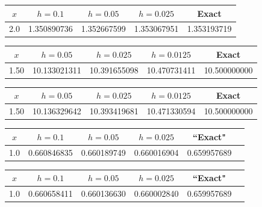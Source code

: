 \bigskip

{\small
\begin{tabular}{|c|r|r|r|r|}\hline
\multicolumn{1}{|c|}{$x$}&
\multicolumn{1}{|c|}{$h=0.1$}&
\multicolumn{1}{|c|}{$h=0.05$}&
\multicolumn{1}{|c|}{$h=0.025$}&
\multicolumn{1}{|c|}{Exact}\\ \hline
2.0 & 1.350890736 & 1.352667599 & 1.353067951 & 1.353193719\\
\hline
\end{tabular}}

\bigskip

{\small
\begin{tabular}{|c|r|r|r|r|}\hline
\multicolumn{1}{|c|}{$x$}&
\multicolumn{1}{|c|}{$h=0.05$}&
\multicolumn{1}{|c|}{$h=0.025$}&
\multicolumn{1}{|c|}{$h=0.0125$}&
\multicolumn{1}{|c|}{Exact}\\ \hline
1.50 & 10.133021311 & 10.391655098 & 10.470731411 & 10.500000000 \\
\hline
\end{tabular}}

\bigskip

{\small
\begin{tabular}{|c|r|r|r|r|}\hline
\multicolumn{1}{|c|}{$x$}&
\multicolumn{1}{|c|}{$h=0.05$}&
\multicolumn{1}{|c|}{$h=0.025$}&
\multicolumn{1}{|c|}{$h=0.0125$}&
\multicolumn{1}{|c|}{Exact}\\ \hline
1.50 & 10.136329642 & 10.393419681 & 10.471330594 & 10.500000000 \\
\hline
\end{tabular}}

\bigskip

{\small
\begin{tabular}{|c|r|r|r|r|r|}
\hline
\multicolumn{1}{|c|}{$x$}&
\multicolumn{1}{|c|}{$h=0.1$}&
\multicolumn{1}{|c|}{$h=0.05$}&
\multicolumn{1}{|c|}{$h=0.025$}&
\multicolumn{1}{|c|}{``Exact"}\\ \hline
1.0 & 0.660846835 & 0.660189749 & 0.660016904 & 0.659957689 \\
\hline
\end{tabular}}

\bigskip

{\small
\begin{tabular}{|c|r|r|r|r|r|}
\hline
\multicolumn{1}{|c|}{$x$}&
\multicolumn{1}{|c|}{$h=0.1$}&
\multicolumn{1}{|c|}{$h=0.05$}&
\multicolumn{1}{|c|}{$h=0.025$}&
\multicolumn{1}{|c|}{``Exact"}\\ \hline
1.0 & 0.660658411 & 0.660136630 & 0.660002840 & 0.659957689 \\
\hline
\end{tabular}}

